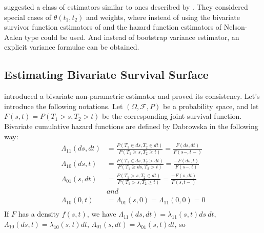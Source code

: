 \documentclass[]{article}
\begin{document}
\cite{fan2000class} suggested a class of estimators similar to ones described by \cite{fan2000dependence} . They considered special cases of $\theta(t_1, t_2)$ and weights, where instead of using the bivariate survivor function estimators of \cite{dabrowska1988kaplan} and \cite{prentice1992covariance} the hazard function estimators of Nelson-Aalen type could be used. And instead of bootstrap variance estimator, an explicit variance formulae can be obtained.




\subsection{Estimating Bivariate Survival Surface}

\cite{dabrowska1988kaplan} introduced a bivariate non-parametric estimator and proved its consistency. Let's introduce the following notations.
Let $(\Omega, \mathcal{F}, P)$ be a probability space, and let $F(s,t) = P(T_1>s, T_2>t)$ be the corresponding joint survival function. Bivariate cumulative hazard functions are defined by Dabrowska in the following way:
	$$
	\begin{aligned}
		\Lambda_{11}(ds,dt) &= \frac{P(T_1 \in ds, T_2\in dt)}{P(T_1 \geq s, T_2 \geq t)} = \frac{F(ds, dt)}{F(s-, t-)}\\
		\Lambda_{10}(ds,t) &= \frac{P(T_1 \in ds, T_2 > dt)}{P(T_1 \geq ds, T_2 > t)} = \frac{-F(ds, t)}{F(s-, t)}\\ %
		\Lambda_{01}(s,dt) &= \frac{P(T_1 > s, T_2\in dt)}{P(T_1 > s, T_2 \geq t)} = \frac{-F(s, dt)}{F(s, t-)}\\
		&and\\
		\Lambda_{10}(0,t) &= \Lambda_{01}(s,0) = \Lambda_{11}(0,0) = 0\\
	\end{aligned}
	$$
If $F$ has a density $f(s,t)$, we have $\Lambda_{11}(ds,dt) = \lambda_{11}(s,t)ds~dt$, $\Lambda_{10}(ds,t) = \lambda_{10}(s,t)dt$, $\Lambda_{01}(s,dt) = \lambda_{01}(s,t)dt$, so
\end{document}
